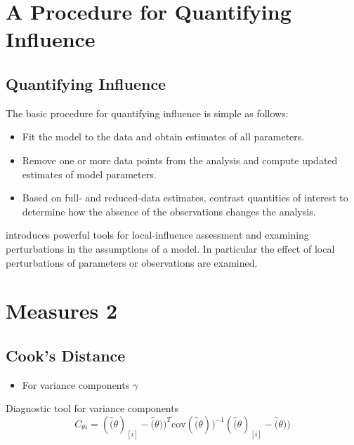 \documentclass[Main.tex]{subfiles}
\begin{document}
		
		
	


	\section{A Procedure for Quantifying Influence}  %
			
			
			\subsection{Quantifying Influence}  %
			
			The basic procedure for quantifying influence is simple as follows:
			
			\begin{itemize}
				\item Fit the model to the data and obtain estimates of all parameters.
				\item Remove one or more data points from the analysis and compute updated estimates of model parameters.
				\item Based on full- and reduced-data estimates, contrast quantities of interest to determine how the absence of the observations changes the analysis.
			\end{itemize}
			
			\citet{cook86} introduces powerful tools for local-influence assessment and examining perturbations in the assumptions of a model. In particular the effect of local perturbations of parameters or observations are examined.
			



	\section{Measures 2} %
	
	\subsection{Cook's Distance} %
	\begin{itemize}
		\item For variance components $\gamma$
	\end{itemize}
	
	Diagnostic tool for variance components
	\[ C_{\theta i} =(\hat(\theta)_{[i]} - \hat(\theta))^{T}\mbox{cov}( \hat(\theta))^{-1}(\hat(\theta)_{[i]} - \hat(\theta))\]
	
\end{document}
